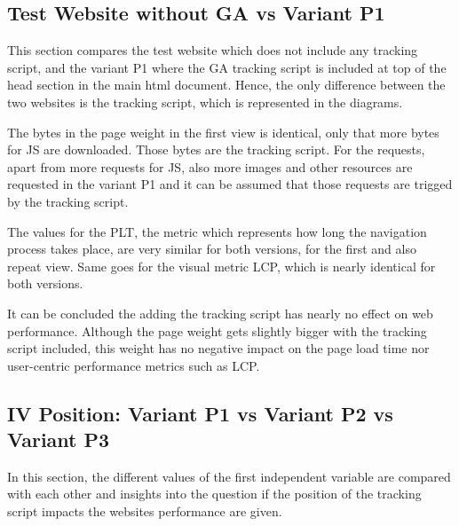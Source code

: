 

\subsection{Test Website without GA vs Variant P1}

This section compares the test website which does not include any tracking script, and the variant P1 where the GA tracking script is included at top of the head section in the main html document. 
Hence, the only difference between the two websites is the tracking script, which is represented in the diagrams.


The bytes in the page weight in the first view is identical, only that more bytes for JS are downloaded.
Those bytes are the tracking script.
For the requests, apart from more requests for JS, also more images and other resources are requested in the variant P1 and it can be assumed that those requests are trigged by the tracking script.




The values for the PLT, the metric which represents how long the navigation process takes place, are very similar for both versions, for the first and also repeat view.
Same goes for the visual metric LCP, which is nearly identical for both versions.



It can be concluded the adding the tracking script has nearly no effect on web performance.
Although the page weight gets slightly bigger with the tracking script included, this weight has no negative impact on the page load time nor user-centric performance metrics such as LCP.



\subsection{IV Position: Variant P1 vs Variant P2 vs Variant P3}

In this section, the different values of the first independent variable are compared with each other and insights into the question if the position of the tracking script impacts the websites performance are given.

